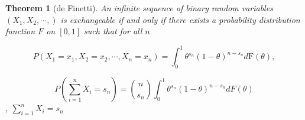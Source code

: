 \documentclass[12pt,oneside]{report}
\newtheorem{theorem}[fact]{Theorem}
\newenvironment{definition}[1][Definition]{\begin{trivlist}
		\item[\hskip \labelsep {\bfseries #1}]}{\end{trivlist}}
\theoremstyle{definition}
\theoremstyle{mystyle}
\begin{document}
	
\begin{theorem}[de Finetti]
	An infinite sequence of  binary  random variables  $(X_{1},X_{2},\cdots,)$    is exchangeable if and only if  there exists a probability distribution  function $F$ on $[0,1]$ such that for all $n$ \cite{Diaconis1}
	
	
	
	
	
	\begin{equation}\label{df1a}
	P(X_{1}=x_{1},X_{2}=x_{2},\cdots,X_{n}=x_{n})=\displaystyle \int_{0}^{1}\theta^{s_{n}}(1-\theta)^{n-s_{n}}d\text{F}(\theta),
	\end{equation}

	
	
	\begin{equation}\label{df2}
	P\left(\sum\limits_{i=1}^{n}X_{i}=s_{n}\right)=\displaystyle \binom{n}{s_{n}}\int_{0}^{1}\theta^{s_{n}}(1-\theta)^{n-s_{n}}dF(\theta)
	\end{equation}
	, $\sum\limits_{i=1}^{n}X_{i}=s_{n}$
	
\end{theorem}
\end{document}
